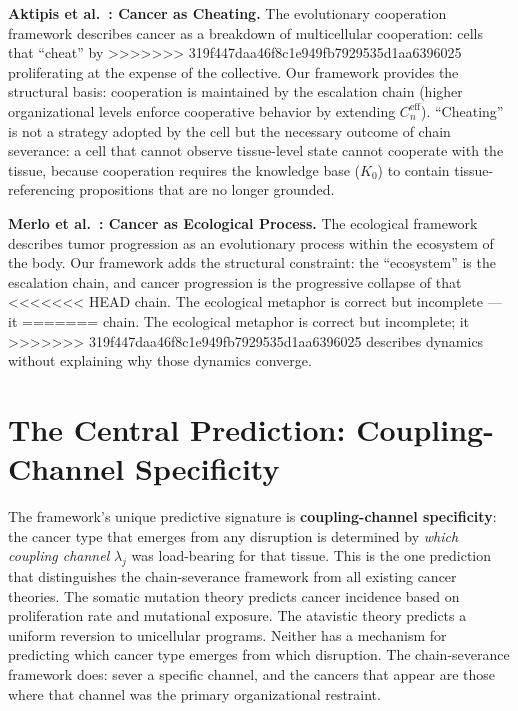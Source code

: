 \documentclass[11pt]{article}
\theoremstyle{definition}
\theoremstyle{remark}
\begin{document}
\textbf{Aktipis et al.\ \cite{Aktipis2015}: Cancer as Cheating.}
The evolutionary cooperation framework describes cancer as a
breakdown of multicellular cooperation: cells that ``cheat'' by
>>>>>>> 319f447daa46f8c1e949fb7929535d1aa6396025
proliferating at the expense of the collective. Our framework
provides the structural basis: cooperation is maintained by the
escalation chain (higher organizational levels enforce cooperative
behavior by extending $C_n^{\mathrm{eff}}$). ``Cheating'' is not a
strategy adopted by the cell but the necessary outcome of chain
severance: a cell that cannot observe tissue-level state cannot
cooperate with the tissue, because cooperation requires the
knowledge base ($K_0$) to contain tissue-referencing propositions
that are no longer grounded.

\textbf{Merlo et al.\ \cite{Merlo2006}: Cancer as Ecological Process.}
The ecological framework describes tumor progression as an
evolutionary process within the ecosystem of the body. Our framework
adds the structural constraint: the ``ecosystem'' is the escalation
chain, and cancer progression is the progressive collapse of that
<<<<<<< HEAD
chain. The ecological metaphor is correct but incomplete --- it
=======
chain. The ecological metaphor is correct but incomplete; it
>>>>>>> 319f447daa46f8c1e949fb7929535d1aa6396025
describes dynamics without explaining why those dynamics converge.

\section{The Central Prediction: Coupling-Channel Specificity}
\label{sec:predictions}

The framework's unique predictive signature is \textbf{coupling-channel
specificity}: the cancer type that emerges from any disruption is
determined by \emph{which coupling channel} $\lambda_j$ was
load-bearing for that tissue. This is the one prediction that
distinguishes the chain-severance framework from all existing cancer
theories. The somatic mutation theory predicts cancer incidence based on
proliferation rate and mutational exposure. The atavistic theory
predicts a uniform reversion to unicellular programs. Neither has a
mechanism for predicting which cancer type emerges from which
disruption. The chain-severance framework does: sever a specific
channel, and the cancers that appear are those where that channel was
the primary organizational restraint.
\end{document}
